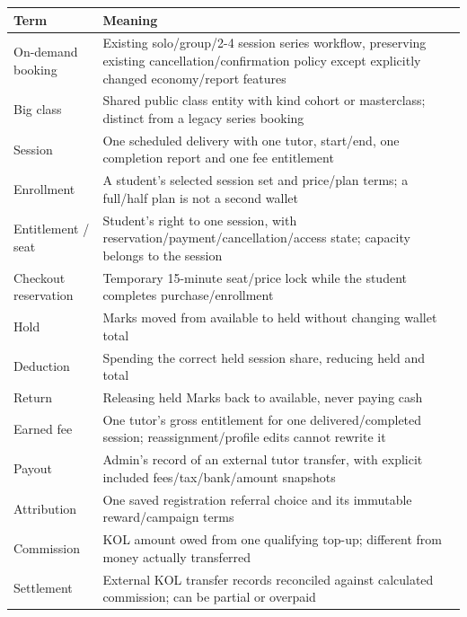 \documentclass[11pt,a4paper]{article}
\newcounter{none}
\begin{document}
{\def\LTcaptype{none} %
\begin{longtable}[]{@{}
  >{\raggedright\arraybackslash}p{}
  >{\raggedright\arraybackslash}p{}@{}}
\toprule\noalign{}
\begin{minipage}[b]{\linewidth}\raggedright
Term
\end{minipage} & \begin{minipage}[b]{\linewidth}\raggedright
Meaning
\end{minipage} \\
\midrule\noalign{}
\endhead
\bottomrule\noalign{}
\endlastfoot
On-demand booking & Existing solo/group/2-4 session series workflow, preserving existing cancellation/confirmation policy except explicitly changed economy/report features \\
Big class & Shared public class entity with kind cohort or masterclass; distinct from a legacy series booking \\
Session & One scheduled delivery with one tutor, start/end, one completion report and one fee entitlement \\
Enrollment & A student's selected session set and price/plan terms; a full/half plan is not a second wallet \\
Entitlement / seat & Student's right to one session, with reservation/payment/cancellation/access state; capacity belongs to the session \\
Checkout reservation & Temporary 15-minute seat/price lock while the student completes purchase/enrollment \\
Hold & Marks moved from available to held without changing wallet total \\
Deduction & Spending the correct held session share, reducing held and total \\
Return & Releasing held Marks back to available, never paying cash \\
Earned fee & One tutor's gross entitlement for one delivered/completed session; reassignment/profile edits cannot rewrite it \\
Payout & Admin's record of an external tutor transfer, with explicit included fees/tax/bank/amount snapshots \\
Attribution & One saved registration referral choice and its immutable reward/campaign terms \\
Commission & KOL amount owed from one qualifying top-up; different from money actually transferred \\
Settlement & External KOL transfer records reconciled against calculated commission; can be partial or overpaid \\
\end{longtable}
}
\end{document}
